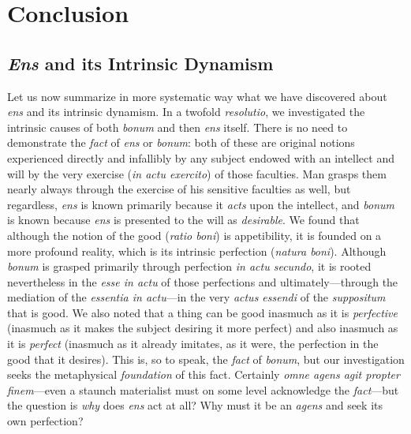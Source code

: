 
\chapter{Conclusion}
\label{chap:conclusion}

\section{\emph{Ens} and its Intrinsic Dynamism}

Let us now summarize in more systematic way what we have discovered about \emph{ens} and its intrinsic dynamism. In a twofold \emph{resolutio}, we investigated the intrinsic causes of both \emph{bonum} and then \emph{ens} itself. There is no need to demonstrate the \emph{fact} of \emph{ens} or \emph{bonum}: both of these are original notions experienced directly and infallibly by any subject endowed with an intellect and will by the very exercise (\emph{in actu exercito}) of those faculties. Man grasps them nearly always through the exercise of his sensitive faculties as well, but regardless, \emph{ens} is known primarily because it \emph{acts} upon the intellect, and \emph{bonum} is known because \emph{ens} is presented to the will as \emph{desirable}. We found that although the notion of the good (\emph{ratio boni}) is appetibility, it is founded on a more profound reality, which is its intrinsic perfection (\emph{natura boni}).  Although \emph{bonum} is grasped primarily through perfection \emph{in actu secundo}, it is rooted nevertheless in the \emph{esse in actu} of those perfections and ultimately—through the mediation of the \emph{essentia in actu}—in the very \emph{actus essendi} of the \emph{suppositum} that is good. We also noted that a thing can be good inasmuch as it is 	\emph{perfective} (inasmuch as it makes the subject desiring it more perfect) and also inasmuch as it is \emph{perfect} (inasmuch as it already imitates, as it were, the perfection in the good that it desires). This is, so to speak, the \emph{fact} of \emph{bonum}, but our investigation seeks the metaphysical \emph{foundation} of this fact. Certainly \emph{omne agens agit propter finem}—even a staunch materialist must on some level acknowledge the \emph{fact}—but the question is \emph{why} does \emph{ens} act at all? Why must it be an \emph{agens} and seek its own perfection?

